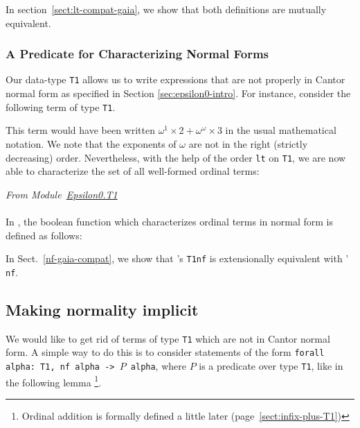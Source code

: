 In section~\vref{sect:lt-compat-gaia}, we show that both definitions are mutually equivalent.

\subsubsection{A Predicate for Characterizing Normal Forms}
\label{sect:t1-nf}

\label{sec:orgheadline74}
\label{sec:orgheadline75}
Our data-type \texttt{T1} allows us to write expressions that
are not properly in Cantor normal form as specified in Section \ref{sec:epsilon0-intro}.
For instance, consider the following term of type  \texttt{T1}. 





This term would have been written \(\omega^1\times 2 + \omega^\omega \times 3\) in the usual mathematical notation. We note that the exponents of $\omega$ are not in the right (strictly decreasing) order.
Nevertheless, with the help of the order \texttt{lt} on \texttt{T1}, we are now able to characterize
the set of all well-formed ordinal terms:


\vspace{4pt}
\noindent
\emph{From Module~\href{../theories/html/hydras.Epsilon0.T1.html\#nf_b}{Epsilon0.T1}}

\label{Predicates:nf-T1}








\paragraph*{\gaiasign}
In \gaia, the boolean function which characterizes ordinal terms in normal form is defined as follows:


In Sect.~\vref{nf-gaia-compat}, we show that \gaia's \texttt{T1nf} is extensionally equivalent with \HydrasLib'  \texttt{nf}.



\subsection{Making normality implicit}
  We would like to get rid of terms of type \texttt{T1} which are not in Cantor normal form.
A simple way to do this is to consider statements of the form 
\texttt{forall alpha: T1, nf alpha -> $P$ alpha}, where $P$ is a predicate over type \texttt{T1}, like in the following lemma \footnote{Ordinal addition is formally defined a little later (page~\ref{sect:infix-plus-T1})}.

